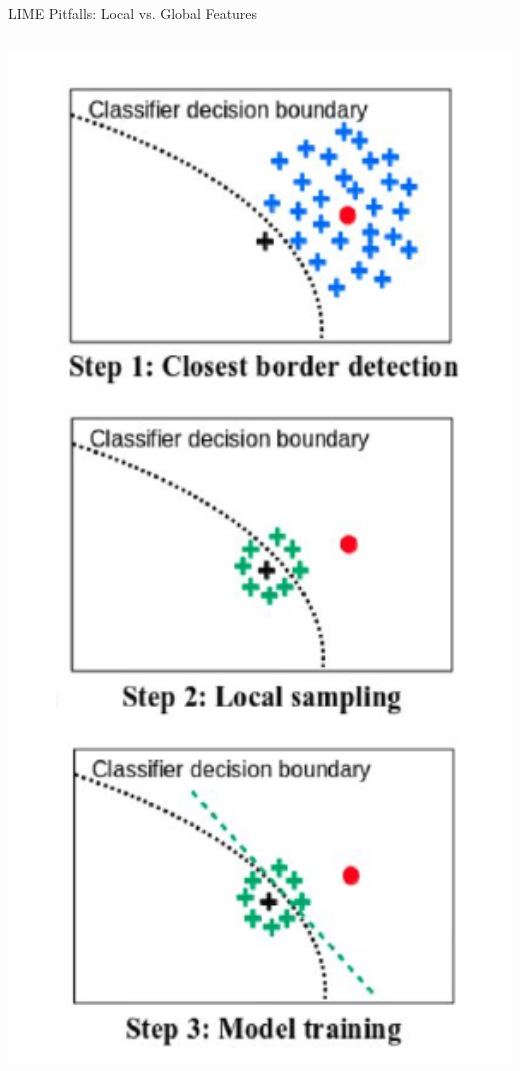 \documentclass[11pt,compress,t,notes=noshow, aspectratio=169, xcolor=table]{beamer}
\begin{document}
\begin{vbframe}[c]{LIME Pitfalls: Local vs. Global Features }
\begin{columns}
\begin{column}{0.2\textwidth}
		\includegraphics[width=1\textwidth]{figure/lime_bordersample2}
		
		\vspace{-0.3cm}
		
 	\end{column}
\end{columns}

\end{vbframe}
\end{document}
